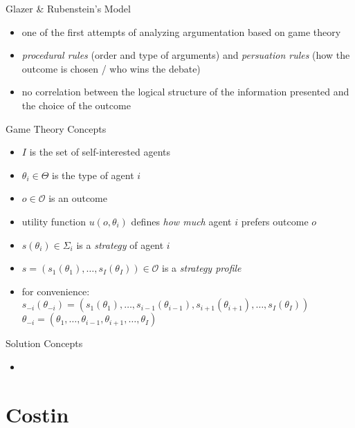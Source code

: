 \documentclass{beamer}
\begin{document}
\begin{frame}{Glazer & Rubenstein's Model}
\begin{itemize}
    \item one of the first attempts of analyzing argumentation based on game theory
    \item \emph{procedural rules} (order and type of arguments) and \emph{persuation rules} (how the outcome is chosen / who wins the debate)
    \item no correlation between the logical structure of the information presented and the choice of the outcome
\end{itemize}
\end{frame}

\begin{frame}{Game Theory Concepts}
\begin{itemize}
    \item $I$ is the set of self-interested agents\pause
    \item $\theta_i \in \Theta$ is the type of agent $i$\pause
    \item $o \in \mathcal{O}$ is an outcome\pause
    \item utility function $u(o, \theta_i)$ defines \emph{how much} agent $i$ prefers outcome $o$\pause
    \item $s(\theta_i) \in \Sigma_i$ is a \emph{strategy} of agent $i$\pause
    \item $s=(s_1(\theta_1),\dots,s_I(\theta_I)) \in \mathcal{O}$ is a \emph{strategy profile}\pause
    \item for convenience:
        $s_{-i}(\theta_{-i}) = (s_1(\theta_1),\dots,s_{i-1}(\theta_{i-1}), s_{i+1}(\theta_{i+1}),\dots,s_I(\theta_I))$
        $\theta_{-i}=(\theta_1,\dots,\theta_{i-1},\theta_{i+1},\dots,\theta_I)$\pause
\end{itemize}
\end{frame}

\begin{frame}{Solution Concepts}
\begin{itemize}
    \item
\end{itemize}
\end{frame}

\section{Costin}
\end{document}
